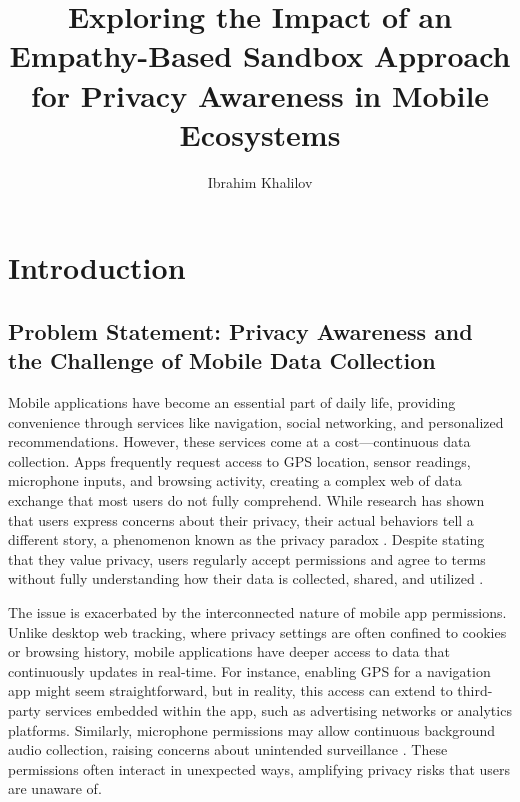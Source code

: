 \documentclass[acmlarge, nonacm]{acmart}
\begin{document}
\title{Exploring the Impact of an Empathy-Based Sandbox
Approach for Privacy Awareness in Mobile Ecosystems}

\author{Ibrahim Khalilov}

\maketitle

\section{Introduction}

\subsection{Problem Statement: Privacy Awareness and the Challenge of Mobile Data Collection}

Mobile applications have become an essential part of daily life, providing convenience through services like navigation, social networking, and personalized recommendations. However, these services come at a cost—continuous data collection. Apps frequently request access to GPS location, sensor readings, microphone inputs, and browsing activity, creating a complex web of data exchange that most users do not fully comprehend. While research has shown that users express concerns about their privacy, their actual behaviors tell a different story, a phenomenon known as the privacy paradox \cite{baruh2017big}. Despite stating that they value privacy, users regularly accept permissions and agree to terms without fully understanding how their data is collected, shared, and utilized \cite{kokolakis2017privacy}.

The issue is exacerbated by the interconnected nature of mobile app permissions. Unlike desktop web tracking, where privacy settings are often confined to cookies or browsing history, mobile applications have deeper access to data that continuously updates in real-time. For instance, enabling GPS for a navigation app might seem straightforward, but in reality, this access can extend to third-party services embedded within the app, such as advertising networks or analytics platforms. Similarly, microphone permissions may allow continuous background audio collection, raising concerns about unintended surveillance \cite{Gao2019}. These permissions often interact in unexpected ways, amplifying privacy risks that users are unaware of.
\end{document}
